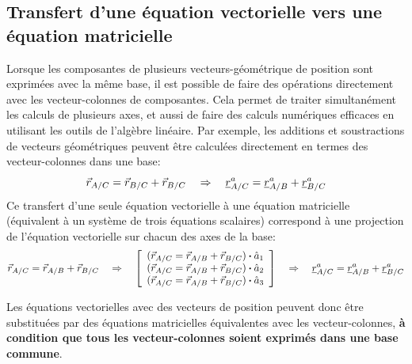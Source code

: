 \subsection{Transfert d'une équation vectorielle vers une équation matricielle} 
%
Lorsque les composantes de plusieurs vecteurs-géométrique de position sont exprimées avec la même base, il est possible de faire des opérations directement avec les vecteur-colonnes de composantes. Cela permet de traiter simultanément les calculs de plusieurs axes, et aussi de faire des calculs numériques efficaces en utilisant les outils de l'algèbre linéaire. Par exemple, les additions et soustractions de vecteurs géométriques peuvent être calculées directement en termes des vecteur-colonnes dans une base:
\begin{equation}
\vec{r}_{A/C}   = \vec{r}_{B/C} + \vec{r}_{B/C}   \quad \Rightarrow \quad
\underline{r}_{A/C}^a = \underline{r}_{A/B}^a + \underline{r}_{B/C}^a
\end{equation} 
Ce transfert d'une seule équation vectorielle à une équation matricielle (équivalent à un système de trois équations scalaires) correspond à une projection de l'équation vectorielle sur chacun des axes de la base:
\begin{equation}
\vec{r}_{A/C}   = \vec{r}_{A/B} + \vec{r}_{B/C}  
\quad \Rightarrow \quad
\left[ \begin{array}{c} (\vec{r}_{A/C}   = \vec{r}_{A/B} + \vec{r}_{B/C}   ) \boldsymbol{\cdot} \hat{a}_1 \\ (\vec{r}_{A/C}   = \vec{r}_{A/B} + \vec{r}_{B/C}   ) \boldsymbol{\cdot} \hat{a}_2 \\ (\vec{r}_{A/C}   = \vec{r}_{A/B} + \vec{r}_{B/C}  ) \boldsymbol{\cdot} \hat{a}_3  \end{array} \right] 
\quad \Rightarrow \quad
\underline{r}_{A/C}^a = \underline{r}_{A/B}^a + \underline{r}_{B/C}^a
\end{equation} 

Les équations vectorielles avec des vecteurs de position peuvent donc être substituées par des équations matricielles équivalentes avec les vecteur-colonnes,\textbf{ à condition que tous les vecteur-colonnes soient exprimés dans une base commune}. 
  


